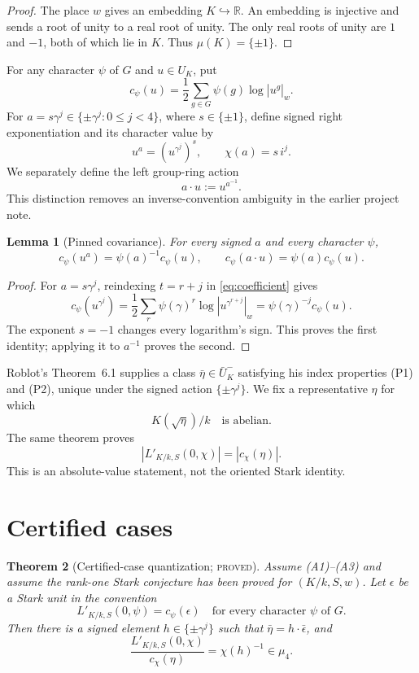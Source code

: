 \documentclass[11pt]{article}
\newtheorem{theorem}{Theorem}
\newtheorem{lemma}[theorem]{Lemma}
\newcommand{\muK}{\mu(K)}
\newcommand{\Lprime}{L'_{K/k,S}}
\begin{document}
\begin{proof}
The place \(w\) gives an embedding \(K\hookrightarrow\mathbb R\).
An embedding is injective and sends a root of unity to a real root of
unity.  The only real roots of unity are \(1\) and \(-1\), both of
which lie in \(K\).  Thus \(\muK=\{\pm1\}\).
\end{proof}

For any character \(\psi\) of \(G\) and \(u\in U_K\), put
\[
c_\psi(u)=\frac12\sum_{g\in G}\psi(g)\log|u^g|_w.
\tag{1}\label{eq:coefficient}
\]
For \(a=s\gamma^j\in\{\pm\gamma^j:0\le j<4\}\), where
\(s\in\{\pm1\}\), define signed right exponentiation and its character
value by
\[
u^a=(u^{\gamma^j})^s,\qquad
\chi(a)=s\,i^j.
\]
We separately define the left group-ring action
\[
a\mathbin{\cdot}u:=u^{a^{-1}}.
\tag{2}\label{eq:left-action}
\]
This distinction removes an inverse-convention ambiguity in the
earlier project note.

\begin{lemma}[Pinned covariance]\label{lem:covariance}
For every signed \(a\) and every character \(\psi\),
\[
c_\psi(u^a)=\psi(a)^{-1}c_\psi(u),
\qquad
c_\psi(a\mathbin{\cdot}u)=\psi(a)c_\psi(u).
\tag{3}\label{eq:covariance}
\]
\end{lemma}

\begin{proof}
For \(a=s\gamma^j\), reindexing \(t=r+j\) in
\eqref{eq:coefficient} gives
\[
c_\psi(u^{\gamma^j})
=\frac12\sum_r\psi(\gamma)^r\log|u^{\gamma^{r+j}}|_w
=\psi(\gamma)^{-j}c_\psi(u).
\]
The exponent \(s=-1\) changes every logarithm's sign.  This proves the
first identity; applying it to \(a^{-1}\) proves the second.
\end{proof}

Roblot's Theorem~6.1 \cite[pp.~404--405]{Roblot2013} supplies a class
\(\bar\eta\in\bar U_K^-\) satisfying his index properties (P1) and
(P2), unique under the signed action \(\{\pm\gamma^j\}\).  We fix a
representative \(\eta\) for which
\[
K(\sqrt\eta)/k\quad\text{is abelian}.
\tag{4}\label{eq:weak-abelian}
\]
The same theorem proves
\[
|\Lprime(0,\chi)|=|c_\chi(\eta)|.
\tag{5}\label{eq:weak-absolute}
\]
This is an absolute-value statement, not the oriented Stark identity.

\section{Certified cases}

\begin{theorem}[Certified-case quantization; \textsc{proved}]
\label{thm:certified}
Assume \emph{(A1)--(A3)} and assume the rank-one Stark conjecture has
been proved for \((K/k,S,w)\).  Let \(\epsilon\) be a Stark unit in
the convention
\[
\Lprime(0,\psi)=c_\psi(\epsilon)
\quad\text{for every character }\psi\text{ of }G.
\tag{6}\label{eq:stark}
\]
Then there is a signed element \(h\in\{\pm\gamma^j\}\) such that
\(\bar\eta=h\mathbin{\cdot}\bar\epsilon\), and
\[
\boxed{\frac{\Lprime(0,\chi)}{c_\chi(\eta)}
       =\chi(h)^{-1}\in\mu_4.}
\tag{7}\label{eq:quantized}
\]
\end{theorem}
\end{document}
